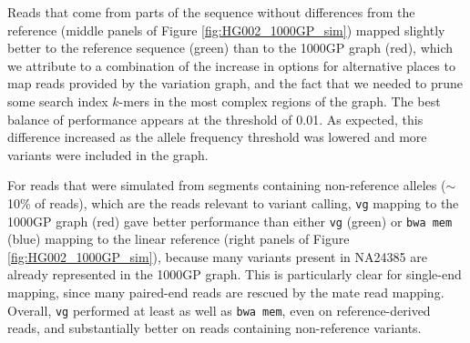 \documentclass[a4paper,12pt,numbered,oneside]{Classes/PhDThesisPSnPDF}
\begin{document}
Reads that come from parts of the sequence without differences from the reference (middle panels of Figure \ref{fig:HG002_1000GP_sim}) mapped slightly better to the reference sequence (green) than to the 1000GP graph (red), which we attribute to a combination of the increase in options for alternative places to map reads provided by the variation graph, and the fact that we needed to prune some search index $k$-mers in the most complex regions of the graph.
The best balance of performance appears at the threshold of 0.01.
As expected, this difference increased as the allele frequency threshold was lowered and more variants were included in the graph.

For reads that were simulated from segments containing non-reference alleles ($\sim$10\% of reads), which are the reads relevant to variant calling, {\tt vg} mapping to the 1000GP graph (red) gave better performance than either {\tt vg} (green) or {\tt bwa mem} (blue) mapping to the linear reference (right panels of Figure \ref{fig:HG002_1000GP_sim}), because many variants present in NA24385 are already represented in the 1000GP graph.
This is particularly clear for single-end mapping, since many paired-end reads are rescued by the mate read mapping.
Overall, {\tt vg} performed at least as well as {\tt bwa mem}, even on reference-derived reads, and substantially better on reads containing non-reference variants.
\end{document}
